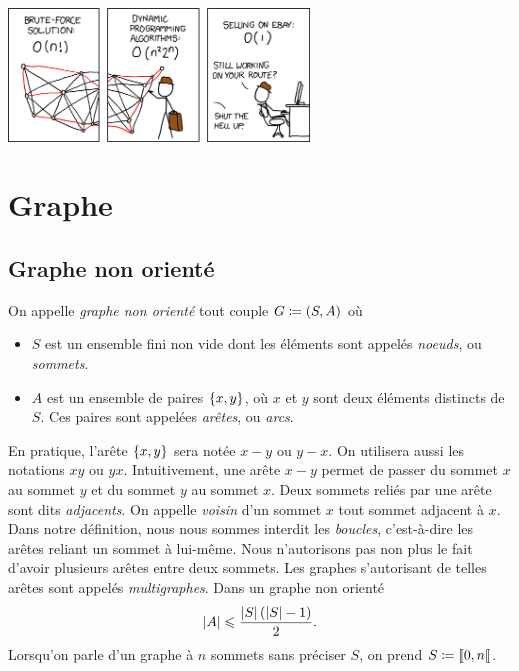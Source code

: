 \documentclass{magnolia}
\begin{document}
\hfill\includegraphics[width=0.6\textwidth]{../../Commun/Images/python-cours-complexity}
\magtoc

\section{Graphe}

\subsection{Graphe non orienté}

\begin{definition}
On appelle \emph{graphe non orienté} tout couple $G\coloneqq\left(S,A\right)$ où
\begin{itemize}
\item $S$ est un ensemble fini non vide dont les éléments sont appelés
  \emph{noeuds}, ou \emph{sommets}.
\item $A$ est un ensemble de paires $\left\{x,y\right\}$, où $x$ et $y$ sont deux éléments
  distincts de $S$. Ces paires sont appelées \emph{arêtes}, ou \emph{arcs}.
\end{itemize}
\end{definition}

\begin{remarques}
\remarque En pratique, l'arête $\left\{x,y\right\}$ sera notée $x-y$ ou $y-x$. On utilisera aussi
  les notations $xy$ ou $yx$. Intuitivement, une
  arête $x-y$ permet de passer du sommet $x$ au sommet $y$ et du sommet $y$ au sommet $x$.
  Deux sommets reliés par une arête sont dits \emph{adjacents}. On appelle \emph{voisin}
  d'un sommet $x$ tout sommet adjacent à $x$.
\remarque Dans notre définition, nous nous sommes interdit les
  \emph{boucles}, c'est-à-dire les arêtes reliant un sommet à lui-même. Nous n'autorisons
  pas non plus le fait d'avoir plusieurs arêtes entre deux sommets. Les graphes
  s'autorisant de telles arêtes sont appelés \emph{multigraphes}.
\remarque Dans un graphe non orienté
  \[\left|A\right|\leqslant \frac{\left|S\right|\left(\left|S\right|-1\right)}{2}.\]
\remarque Lorsqu'on parle d'un graphe à $n$ sommets sans préciser $S$, on prend
  $S\coloneqq\left\llbracket 0,n\right\llbracket$.
\end{remarques}
\end{document}
